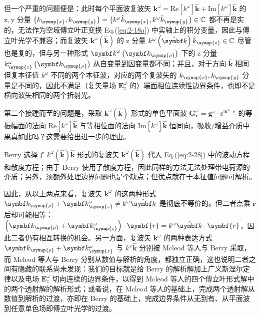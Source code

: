 但一个严重的问题便是：此时每个平面波复波矢 ${\symbf k}^\omega = \mathup{Re} \left[ k^\omega \right] \hat{\symbf k} + \mathup{Im} \left[ k^\omega \right] \hat{\symbf k}$ 的 $\mathup x,\mathup y$ 分量 $\{k_{\symup{x}}, k_{\symup{y}}\} = \{k^\omega \hat{k}_{\symup{x}}, k^\omega \hat{k}_{\symup{y}}\} \in \mathbb{C}$ 都不再是实的，无法作为空域傅立叶正变换 Eq.(\ref{eq:2-18a}) 中实轴上的积分变量，因此与傅立叶光学不兼容；而复波矢 ${\symbf k}^\omega \left( \hat{\symbf k} \right)$ 的 $\mathup z$ 分量 $k^\omega \left( \hat{\symbf k} \right) \hat{k}_{\symup{z}} \in \mathbb{C}$ 尽管也是复的，但与另一种形式 ${\symbf k}^\omega \left( \symbf k_{\symup{\rho}} \right)$ 下的 $\mathup z$ 分量 $k^\omega_{\symup{z}} \left( \symbf k_{\symup{\rho}} \right)$ 从自变量到因变量都不同；并且，对于方向 $\hat{\symbf k}$ 相同但复本征值 $k^\omega$ 不同的两个本征波，对应的两个复波矢的 $k_{\symup{x}}, k_{\symup{y}}$ 分量是不同的，因此不满足（复矢量场 $\symbf E^{\omega}_z$ 的）端面相位连续性边界条件，也即不是横向波矢相同的两个折射光。

第二个接踵而至的问题是，采取 ${\symbf k}^\omega \left( \hat{\symbf k} \right)$ 形式的单色平面波 $\symbf G^{\omega}_{\symbf r} = \symbf g^{\omega} \cdot \mathbb{e}^{\mathbb{i} {\symbf k}^\omega \cdot \symbf r}$ 的等振幅面的法向 $\mathup{Re} \left[ k^\omega \right] \hat{\symbf k}$ 与等相位面的法向 $\mathup{Im} \left[ k^\omega \right] \hat{\symbf k}$ 恒同向，吸收/增益介质中果真如此吗？这需要给出进一步的理由。

Berry 选择了 $k^\omega \left( \hat{\symbf k} \right) \hat{\symbf k}$ 形式的复波矢 ${\symbf k}^\omega \left( \hat{\symbf k} \right)$ 代入 Eq.(\ref{eq:2-28}) 中的波动方程和散度方程；由于 Berry 使用了散度方程，因此同样的方法无法处理带电荷源的介质；另外，须额外处理边界问题也是个缺点；但优点就在于本征值问题可解析。

因此，从以上两点来看，复波矢 ${\symbf k}^\omega$ 的这两种形式 $\symbf k_{\symup{\rho}} + \symbf k^\omega_{\symup{z}} \neq k^\omega \hat{\symbf k}$ 是彻底不等价的。但二者点乘 $\symbf{r}$ 后却可能相等：$\left( \symbf k_{\symup{\rho}} + \symbf k^\omega_{\symup{z}} \right) \cdot \symbf{r} = k^\omega \hat{\symbf k} \cdot \symbf{r}$，因此二者仍有相互转换的机会。另一方面，复波矢 ${\symbf k}^\omega$ 的两种表达方式 $\symbf k_{\symup{\rho}} + \symbf k^\omega_{\symup{z}}$ 与 $k^\omega \hat{\symbf k}$ 分别被 Mcleod 等人与 Berry 采取，而 Mcleod 等人与 Berry 分别从数值与解析的角度，都独立正确，这也说明二者之间有隐藏的联系尚未发现：我们的目标就是给 Berry 的解析解加上广义斯涅尔定律以及电场 $\symbf E^{\omega}_z$ 切向连续的边界条件，以得到 Mcleod 等人的四个傅立叶形式解中的两个透射解的解析形式；或者说，在 Mcleod 等人的基础上，完成两个透射解从数值到解析的过渡，亦即在 Berry 的基础上，完成边界条件从无到有、从平面波到任意单色场即傅立叶光学的过渡。

